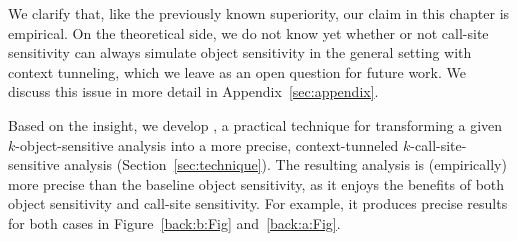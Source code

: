 
We clarify that, like the previously known superiority, our claim in this chapter is empirical. 
On the theoretical side, we do not know yet whether or not call-site sensitivity can always simulate object sensitivity in the general setting with context tunneling, which we leave as an open question for future work. We discuss this issue in more detail in Appendix~\ref{sec:appendix}.


\myparagraph{\ourtechnique}
Based on the insight, 
we develop \ourtechnique, a practical technique for transforming a given $k$-object-sensitive analysis 
into a more precise, context-tunneled $k$-call-site-sensitive analysis (Section~\ref{sec:technique}).  The
resulting analysis is (empirically) more precise than the baseline
object sensitivity, as it enjoys the benefits of both object
sensitivity and call-site sensitivity. For example, it
produces precise results for both cases in Figure~\ref{back:b:Fig} and~\ref{back:a:Fig}.


